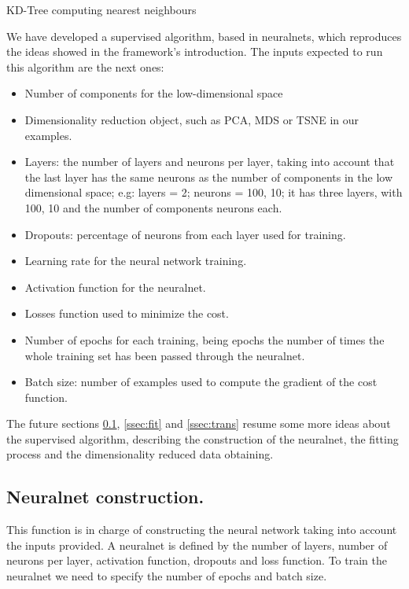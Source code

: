 \documentclass[a4paper,11pt,spanish]{report}
\begin{document}
\begin{table}[h]
\centering

\caption{\label{metrics24}KD-Tree computing nearest neighbours}
\end{table}

\newpage

We have developed a supervised algorithm, based in neuralnets, which reproduces the ideas showed in the framework's introduction.
The inputs expected to run this algorithm are the next ones:

\begin{itemize}
\item Number of components for the low-dimensional space
\item Dimensionality reduction object, such as PCA, MDS or TSNE in our examples.
\item Layers: the number of layers and neurons per layer, taking into account that the last layer has the same neurons as the number of components in the low dimensional space; e.g: layers = 2; neurons = 100, 10; it has three layers, with 100, 10 and the number of components neurons each.
\item Dropouts: percentage of neurons from each layer used for training.
\item Learning rate for the neural network training.
\item Activation function for the neuralnet.
\item Losses function used to minimize the cost.
\item Number of epochs for each training, being epochs the number of times the whole training set has been passed through the neuralnet.
\item Batch size: number of examples used to compute the gradient of the cost function.
\end{itemize}

The future sections \ref{ssec:nnc}, \ref{ssec:fit} and \ref{ssec:trans} resume some more ideas about the supervised algorithm, describing the construction of the neuralnet, the fitting process and the dimensionality reduced data obtaining.

\subsection{Neuralnet construction.}
\label{ssec:nnc}

This function is in charge of constructing the neural network taking into account the inputs provided. A neuralnet is defined by the number of layers, number of neurons per layer, activation function, dropouts and loss function. To train the neuralnet we need to specify the number of epochs and batch size.
\end{document}

